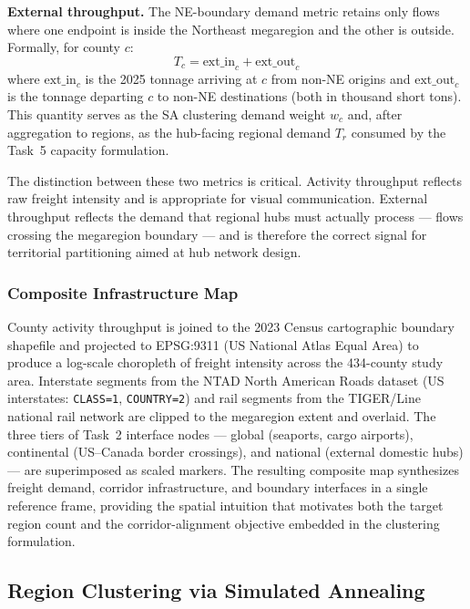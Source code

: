 \textbf{External throughput.} The NE-boundary demand metric retains only flows where one
endpoint is inside the Northeast megaregion and the other is outside. Formally, for county
$c$:
\begin{equation}
  T_c = \text{ext\_in}_c + \text{ext\_out}_c
\end{equation}
where $\text{ext\_in}_c$ is the 2025 tonnage arriving at $c$ from non-NE origins and
$\text{ext\_out}_c$ is the tonnage departing $c$ to non-NE destinations (both in thousand
short tons). This quantity serves as the SA clustering demand weight $w_c$ and, after
aggregation to regions, as the hub-facing regional demand $T_r$ consumed by the Task~5
capacity formulation.

The distinction between these two metrics is critical. Activity throughput reflects raw
freight intensity and is appropriate for visual communication. External throughput reflects
the demand that regional hubs must actually process --- flows crossing the megaregion
boundary --- and is therefore the correct signal for territorial partitioning aimed at hub
network design.

\subsubsection{Composite Infrastructure Map}

County activity throughput is joined to the 2023 Census cartographic boundary shapefile and
projected to EPSG:9311 (US National Atlas Equal Area) to produce a log-scale choropleth of
freight intensity across the 434-county study area. Interstate segments from the NTAD North
American Roads dataset (US interstates: \texttt{CLASS=1}, \texttt{COUNTRY=2}) and rail
segments from the TIGER/Line national rail network are clipped to the megaregion extent and
overlaid. The three tiers of Task~2 interface nodes --- global (seaports, cargo airports),
continental (US--Canada border crossings), and national (external domestic hubs) --- are
superimposed as scaled markers. The resulting composite map synthesizes freight demand,
corridor infrastructure, and boundary interfaces in a single reference frame, providing the
spatial intuition that motivates both the target region count and the corridor-alignment
objective embedded in the clustering formulation.

\subsection{Region Clustering via Simulated Annealing}

